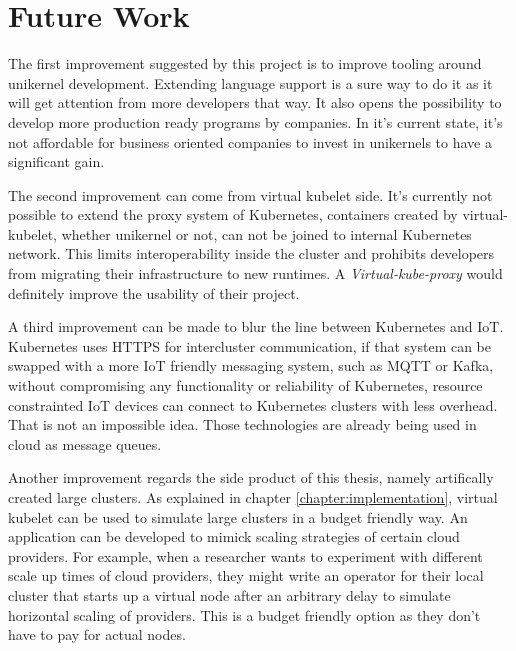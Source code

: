 \section{Future Work}
The first improvement suggested by this project is to improve tooling around unikernel development. Extending language support is a sure way to do it as it will get attention from more developers that way. It also opens the possibility to develop more production ready programs by companies. In it's current state, it's not affordable for business oriented companies to invest in unikernels to have a significant gain.

The second improvement can come from virtual kubelet side. It's currently not possible to extend the proxy system of Kubernetes, containers created by virtual-kubelet, whether unikernel or not, can not be joined to internal Kubernetes network. This limits interoperability inside the cluster and prohibits developers from migrating their infrastructure to new runtimes. A \textit{Virtual-kube-proxy} would definitely improve the usability of their project.

A third improvement can be made to blur the line between Kubernetes and IoT. Kubernetes uses HTTPS for intercluster communication, if that system can be swapped with a more IoT friendly messaging system, such as MQTT or Kafka, without compromising any functionality or reliability of Kubernetes, resource constrainted IoT devices can connect to Kubernetes clusters with less overhead. That is not an impossible idea. Those technologies are already being used in cloud as message queues.

Another improvement regards the side product of this thesis, namely artifically created large clusters. As explained in chapter \ref{chapter:implementation}, virtual kubelet can be used to simulate large clusters in a budget friendly way. An application can be developed to mimick scaling strategies of certain cloud providers. For example, when a researcher wants to experiment with different scale up times of cloud providers, they might write an operator for their local cluster that starts up a virtual node after an arbitrary delay to simulate horizontal scaling of providers. This is a budget friendly option as they don't have to pay for actual nodes.